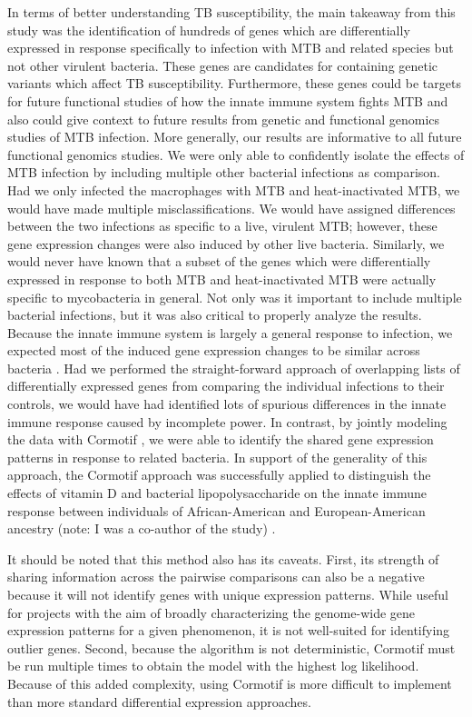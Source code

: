 In terms of better understanding TB susceptibility, the main takeaway from this
study was the identification of hundreds of genes which are differentially
expressed in response specifically to infection with MTB and related species but
not other virulent bacteria. These genes are candidates for containing genetic
variants which affect TB susceptibility. Furthermore, these genes could be
targets for future functional studies of how the innate immune system fights MTB
and also could give context to future results from genetic and functional
genomics studies of MTB infection. More generally, our results are informative
to all future functional genomics studies. We were only able to confidently
isolate the effects of MTB infection by including multiple other bacterial
infections as comparison. Had we only infected the macrophages with MTB and
heat-inactivated MTB, we would have made multiple misclassifications. We would
have assigned differences between the two infections as specific to a live,
virulent MTB; however, these gene expression changes were also induced by other
live bacteria. Similarly, we would never have known that a subset of the genes
which were differentially expressed in response to both MTB and heat-inactivated
MTB were actually specific to mycobacteria in general. Not only was it important
to include multiple bacterial infections, but it was also critical to properly
analyze the results. Because the innate immune system is largely a general
response to infection, we expected most of the induced gene expression changes
to be similar across bacteria \citep{Huang2001, Boldrick2002, Nau2002, Jenner2005}.
Had we performed the straight-forward approach of
overlapping lists of differentially expressed genes from comparing the
individual infections to their controls, we would have had identified lots of
spurious differences in the innate immune response caused by incomplete
power. In contrast, by jointly modeling the data with Cormotif \citep{Wei2015}, we were able to
identify the shared gene expression patterns in response to related bacteria. In
support of the generality of this approach, the Cormotif approach was
successfully applied to distinguish the effects of vitamin D and bacterial
lipopolysaccharide on the innate immune response between individuals of
African-American and European-American ancestry (note: I was a co-author of the
study) \citep{Kariuki2016}.

It should be noted that this method also has its caveats. First, its strength of
sharing information across the pairwise comparisons can also be a negative
because it will not identify genes with unique expression patterns. While useful
for projects with the aim of broadly characterizing the genome-wide gene
expression patterns for a given phenomenon, it is not well-suited for
identifying outlier genes. Second, because the algorithm is not deterministic,
Cormotif must be run multiple times to obtain the model with the highest log
likelihood. Because of this added complexity, using Cormotif is more difficult
to implement than more standard differential expression approaches.

